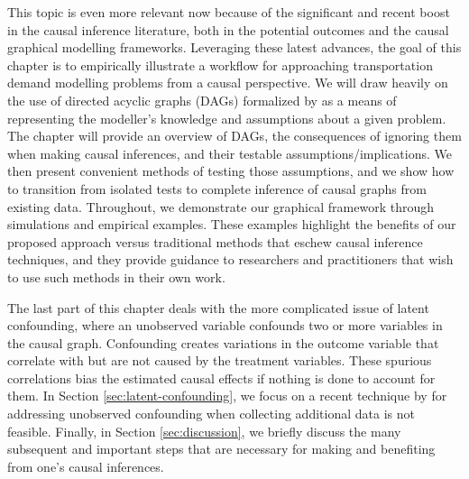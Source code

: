 This topic is even more relevant now because of the significant and recent boost in the causal inference literature, both in the potential outcomes and the causal graphical modelling frameworks.
Leveraging these latest advances, the goal of this chapter is to empirically illustrate a workflow for approaching
transportation demand modelling problems from a causal perspective.
We will draw heavily on the use of directed acyclic graphs (DAGs) formalized by \citet{pearl_causality_2000} as a means of representing the modeller's knowledge and assumptions about a given problem.
The chapter will provide an overview of DAGs,
the consequences of ignoring them when making causal inferences,
and their testable assumptions/implications.
We then present convenient methods of testing those assumptions,
and we show how to transition from isolated tests to complete inference of causal graphs from existing data.
Throughout, we demonstrate our graphical framework through simulations and empirical examples.
These examples highlight the benefits of our proposed approach versus traditional methods that eschew causal inference techniques,
and they provide guidance to researchers and practitioners that wish to use such methods in their own work.

The last part of this chapter deals with the more complicated issue of latent
confounding, where an unobserved variable confounds two or more variables in the causal graph.
Confounding creates variations in the outcome variable that correlate with but are not caused by the treatment variables.
These spurious correlations bias the estimated causal effects if nothing is done to account for them.
In Section \ref{sec:latent-confounding}, we focus on a recent technique by \citet{wang_2019_blessings} for addressing unobserved confounding when collecting additional data is not feasible.
Finally, in Section \ref{sec:discussion}, we briefly discuss the many subsequent and important steps that are necessary for making and benefiting from one's causal inferences.

